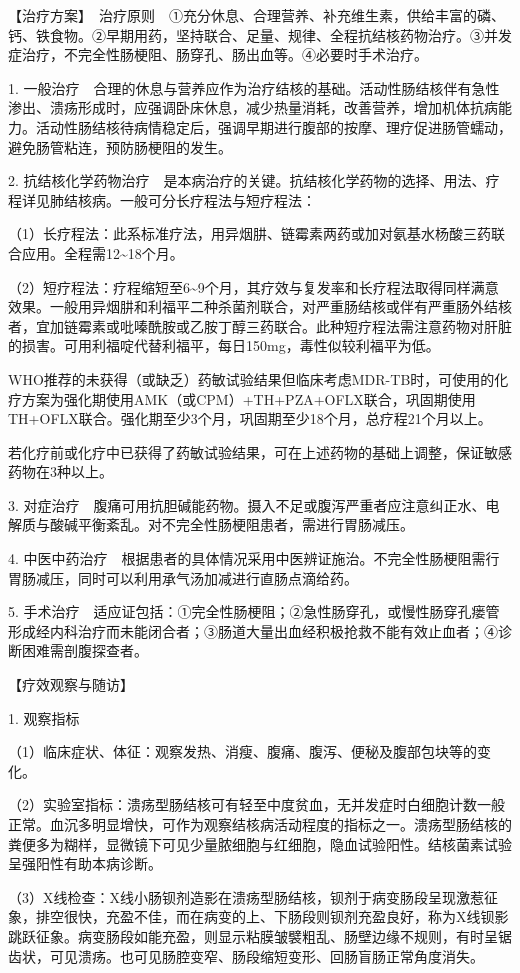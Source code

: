 【治疗方案】　治疗原则　①充分休息、合理营养、补充维生素，供给丰富的磷、钙、铁食物。②早期用药，坚持联合、足量、规律、全程抗结核药物治疗。③并发症治疗，不完全性肠梗阻、肠穿孔、肠出血等。④必要时手术治疗。

1.
一般治疗　合理的休息与营养应作为治疗结核的基础。活动性肠结核伴有急性渗出、溃疡形成时，应强调卧床休息，减少热量消耗，改善营养，增加机体抗病能力。活动性肠结核待病情稳定后，强调早期进行腹部的按摩、理疗促进肠管蠕动，避免肠管粘连，预防肠梗阻的发生。

2.
抗结核化学药物治疗　是本病治疗的关键。抗结核化学药物的选择、用法、疗程详见肺结核病。一般可分长疗程法与短疗程法：

（1）长疗程法：此系标准疗法，用异烟肼、链霉素两药或加对氨基水杨酸三药联合应用。全程需12\textasciitilde{}18个月。

（2）短疗程法：疗程缩短至6\textasciitilde{}9个月，其疗效与复发率和长疗程法取得同样满意效果。一般用异烟肼和利福平二种杀菌剂联合，对严重肠结核或伴有严重肠外结核者，宜加链霉素或吡嗪酰胺或乙胺丁醇三药联合。此种短疗程法需注意药物对肝脏的损害。可用利福啶代替利福平，每日150mg，毒性似较利福平为低。

WHO推荐的未获得（或缺乏）药敏试验结果但临床考虑MDR-TB时，可使用的化疗方案为强化期使用AMK（或CPM）+TH+PZA+OFLX联合，巩固期使用TH+OFLX联合。强化期至少3个月，巩固期至少18个月，总疗程21个月以上。

若化疗前或化疗中已获得了药敏试验结果，可在上述药物的基础上调整，保证敏感药物在3种以上。

3.
对症治疗　腹痛可用抗胆碱能药物。摄入不足或腹泻严重者应注意纠正水、电解质与酸碱平衡紊乱。对不完全性肠梗阻患者，需进行胃肠减压。

4.
中医中药治疗　根据患者的具体情况采用中医辨证施治。不完全性肠梗阻需行胃肠减压，同时可以利用承气汤加减进行直肠点滴给药。

5.
手术治疗　适应证包括：①完全性肠梗阻；②急性肠穿孔，或慢性肠穿孔瘘管形成经内科治疗而未能闭合者；③肠道大量出血经积极抢救不能有效止血者；④诊断困难需剖腹探查者。

【疗效观察与随访】

1. 观察指标

（1）临床症状、体征：观察发热、消瘦、腹痛、腹泻、便秘及腹部包块等的变化。

（2）实验室指标：溃疡型肠结核可有轻至中度贫血，无并发症时白细胞计数一般正常。血沉多明显增快，可作为观察结核病活动程度的指标之一。溃疡型肠结核的粪便多为糊样，显微镜下可见少量脓细胞与红细胞，隐血试验阳性。结核菌素试验呈强阳性有助本病诊断。

（3）X线检查：X线小肠钡剂造影在溃疡型肠结核，钡剂于病变肠段呈现激惹征象，排空很快，充盈不佳，而在病变的上、下肠段则钡剂充盈良好，称为X线钡影跳跃征象。病变肠段如能充盈，则显示粘膜皱襞粗乱、肠壁边缘不规则，有时呈锯齿状，可见溃疡。也可见肠腔变窄、肠段缩短变形、回肠盲肠正常角度消失。

